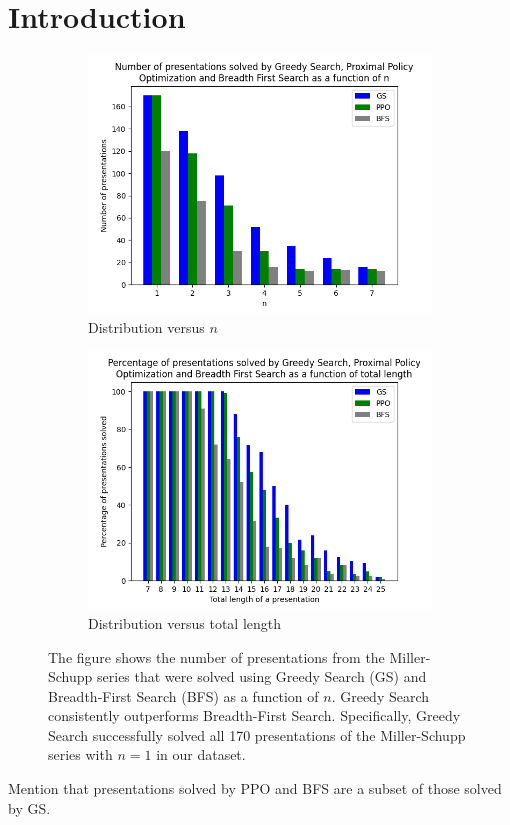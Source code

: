 
\section{Introduction\label{sec:intro}}


\begin{figure}
	\centering
	\begin{subfigure}[b]{0.5\textwidth}
		\includegraphics[width=1.1\textwidth]{fig/performance_vs_n.png}
		\caption{Distribution versus $n$}
		\label{fig:performance_vs_n}
	\end{subfigure}
	
	\begin{subfigure}[b]{0.5\textwidth}
		\centering
		\includegraphics[width=1.1\textwidth]{fig/performance_vs_length.png}
		\caption{Distribution versus total length}
		\label{fig:performance_vs_length}
	\end{subfigure}
	\caption{The figure shows the number of presentations from the Miller-Schupp series that were solved using Greedy Search (GS) and Breadth-First Search (BFS) as a function of \( n \). Greedy Search consistently outperforms Breadth-First Search. Specifically, Greedy Search successfully solved all 170 presentations of the Miller-Schupp series with \( n=1 \) in our dataset.} \label{fig:performance}
	
\end{figure}

Mention that presentations solved by PPO and BFS are a subset of those solved by GS.
